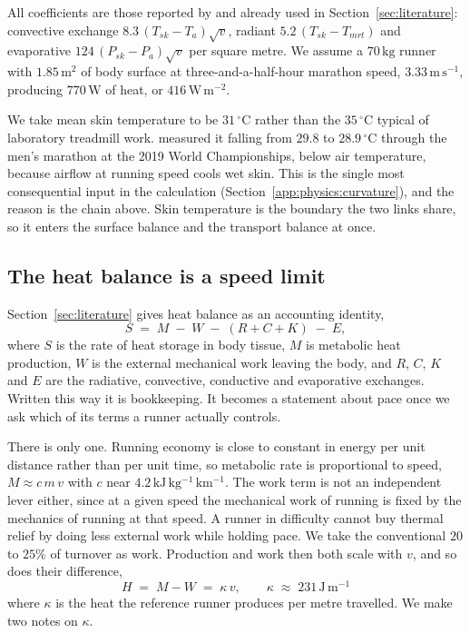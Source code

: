 All coefficients are those reported by \citet{taylor2006} and already used in
Section~\ref{sec:literature}: convective exchange $8.3\,(T_{sk}-T_a)\sqrt{v}$,
radiant $5.2\,(T_{sk}-T_{mrt})$ and evaporative $124\,(P_{sk}-P_a)\sqrt{v}$ per
square metre. We assume a $70\,\mathrm{kg}$ runner with $1.85\,\mathrm{m^2}$ of
body surface at three-and-a-half-hour marathon speed,
$3.33\,\mathrm{m\,s^{-1}}$, producing $770\,\mathrm{W}$ of heat, or
$416\,\mathrm{W\,m^{-2}}$.

We take mean skin temperature to be $31\,^{\circ}$C rather than the
$35\,^{\circ}$C typical of laboratory treadmill work. \citet{aylwin2023}
measured it falling from $29.8$ to $28.9\,^{\circ}$C through the men's marathon
at the 2019 World Championships, below air temperature, because airflow at
running speed cools wet skin. This is the single most consequential input in the
calculation (Section~\ref{app:physics:curvature}), and the reason is the chain
above. Skin temperature is the boundary the two links share, so it enters the
surface balance and the transport balance at once.

\subsection{The heat balance is a speed limit}
\label{app:physics:limit}

Section~\ref{sec:literature} gives heat balance as an accounting identity,
\begin{equation}
  S \;=\; M \;-\; W \;-\; (R + C + K) \;-\; E,
  \label{eq:balance}
\end{equation}
where $S$ is the rate of heat storage in body tissue, $M$ is metabolic heat
production, $W$ is the external mechanical work leaving the body, and $R$, $C$,
$K$ and $E$ are the radiative, convective, conductive and evaporative exchanges.
Written this way it is bookkeeping. It becomes a statement about pace once we
ask which of its terms a runner actually controls.

There is only one. Running economy is close to constant in energy per unit
distance rather than per unit time, so metabolic rate is proportional to speed,
$M \approx c\,m\,v$ with $c$ near $4.2\,\mathrm{kJ\,kg^{-1}\,km^{-1}}$. The work
term is not an independent lever either, since at a given speed the mechanical
work of running is fixed by the mechanics of running at that speed. A runner in
difficulty cannot buy thermal relief by doing less external work while holding
pace. We take the conventional $20$ to $25\%$ of turnover as work. Production
and work then both scale with $v$, and so does their difference,
\begin{equation}
  H \;=\; M - W \;=\; \kappa\,v, \qquad
  \kappa \;\approx\; 231\,\mathrm{J\,m^{-1}}
  \label{eq:production}
\end{equation}
where $\kappa$ is the heat the reference runner produces per metre travelled. We
make two notes on $\kappa$.

